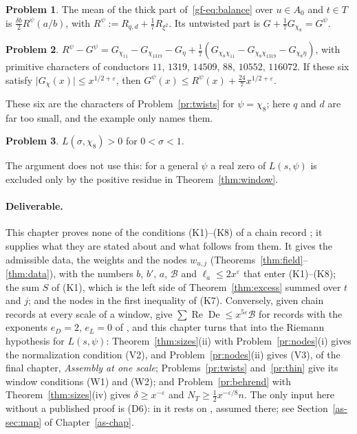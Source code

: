 \documentclass[reqno]{amsart}
\newcounter{chap}
\theoremstyle{definition}
\newtheorem{problem}{Problem}[section]
\theoremstyle{plain}
\newcommand{\Bc}{\mathcal{B}}
\newcommand{\De}{\operatorname{De}}
\renewcommand{\Re}{\operatorname{Re}}
\begin{document}
\begin{problem}\label{pr:chi8-shares}
The mean of the thick part of~\eqref{gf-eq:balance} over \(u \in A_0\) and \(t \in T\) is \(\frac{\delta b}{2}R^\psi(a/b)\), with \(R^\psi := R_{q,d} + \frac17R_{\xi^2}\).  Its untwisted part is \(G + \frac17G_{\chi_8} = G^\psi\).
\end{problem}

\begin{problem}\label{pr:chi8-twists}
\(R^\psi - G^\psi = G_{\chi_{11}} - G_{\chi_{1319}} - G_\eta + \frac17(G_{\chi_8\chi_{11}} - G_{\chi_8\chi_{1319}} - G_{\chi_8\eta})\), with primitive characters of conductors \(11\), \(1319\), \(14509\), \(88\), \(10552\), \(116072\).  If these six satisfy \(\lvert G_\chi(x)\rvert \le x^{1/2+\varepsilon}\), then \(G^\psi(x) \le R^\psi(x) + \frac{24}{7}x^{1/2+\varepsilon}\).
\end{problem}

These six are the characters of Problem~\ref{pr:twists} for \(\psi = \chi_8\); here \(q\) and \(d\) are far too small, and the example only names them.

\begin{problem}\label{pr:chi8-positive}
\(L(\sigma, \chi_8) > 0\) for \(0 < \sigma < 1\).
\end{problem}

The argument does not use this: for a general \(\psi\) a real zero of \(L(s,\psi)\) is excluded only by the positive residue in Theorem~\ref{thm:window}.

\paragraph{Deliverable.}  This chapter proves none of the conditions (K1)--(K8) of a chain record \cite[Def.~18.9]{Adr}; it supplies what they are stated about and what follows from them.  It gives the admissible data, the weights and the nodes \(w_{u,j}\) (Theorems~\ref{thm:field}--\ref{thm:data}), with the numbers \(b\), \(b'\), \(a\), \(\Bc\) and \(\ell_a \le 2x^\varepsilon\) that enter (K1)--(K8); the sum \(S\) of (K1), which is the left side of Theorem~\ref{thm:excess} summed over \(t\) and \(j\); and the nodes in the first inequality of (K7).  Conversely, given chain records at every scale of a window, \cite[Props.~18.14 and~18.16]{Adr} give \(\sum\Re\De \le x^{5\varepsilon}\Bc\) for records with the exponents \(e_D = 2\), \(e_L = 0\) of \cite[Hyp.~18.10]{Adr}, and this chapter turns that into the Riemann hypothesis for \(L(s,\psi)\): Theorem~\ref{thm:sizes}(ii) with Problem~\ref{pr:nodes}(i) gives the normalization condition (V2), and Problem~\ref{pr:nodes}(ii) gives (V3), of the final chapter, \emph{Assembly at one scale}; Problems~\ref{pr:twists} and~\ref{pr:thin} give its window conditions (W1) and (W2); and Problem~\ref{pr:behrend} with Theorem~\ref{thm:sizes}(iv) gives \(\delta \ge x^{-\varepsilon}\) and \(N_T \ge \frac12x^{-\varepsilon/8}n\).  The only input here without a published proof is (D6): in \cite{Adr} it rests on \cite[Hyp.~17.11]{Adr}, assumed there; see Section~\ref{as-sec:map} of Chapter~\ref{as-chap}.
\end{document}
